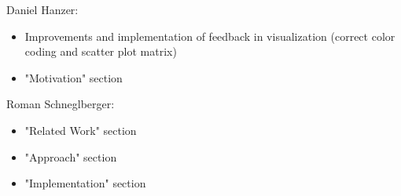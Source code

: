 \documentclass{vgtc}                          %
\begin{document}
Daniel Hanzer:
\begin{itemize}
\item Improvements and implementation of feedback in visualization (correct color coding and scatter plot matrix)
\item "Motivation" section
\end{itemize}

Roman Schneglberger:
\begin{itemize}
\item "Related Work" section
\item "Approach" section
\item "Implementation" section
\end{itemize}
\end{document}
